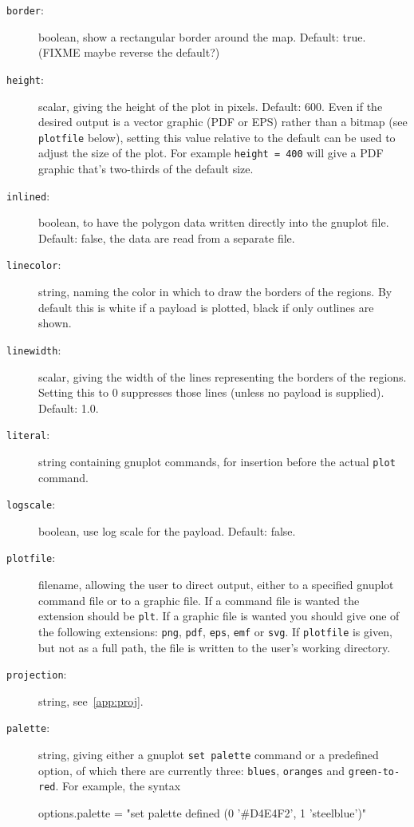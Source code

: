 \documentclass{article}
\begin{document}
\begin{description}
\item[\texttt{border}:] boolean, show a rectangular border around the
  map. Default: true. (FIXME maybe reverse the default?)
\item[\texttt{height}:] scalar, giving the height of the plot in
  pixels. Default: 600. Even if the desired output is a vector graphic
  (PDF or EPS) rather than a bitmap (see \texttt{plotfile} below),
  setting this value relative to the default can be used to adjust the
  size of the plot. For example \texttt{height = 400} will give a PDF
  graphic that's two-thirds of the default size.
\item[\texttt{inlined}:] boolean, to have the polygon data written
  directly into the \textsf{gnuplot} file. Default: false, the data
  are read from a separate file.
\item[\texttt{linecolor}:] string, naming the color in which to draw
  the borders of the regions. By default this is white if a payload is
  plotted, black if only outlines are shown.
\item[\texttt{linewidth}:] scalar, giving the width of the lines
  representing the borders of the regions. Setting this to 0
  suppresses those lines (unless no payload is supplied). Default:
  1.0.
\item[\texttt{literal}:] string containing \textsf{gnuplot} commands,
  for insertion before the actual \texttt{plot} command.
\item[\texttt{logscale}:] boolean, use log scale for the
  payload. Default: false.
\item[\texttt{plotfile}:] filename, allowing the user to direct
  output, either to a specified \textsf{gnuplot} command file or to a
  graphic file. If a command file is wanted the extension should be
  \texttt{plt}. If a graphic file is wanted you should give one of the
  following extensions: \texttt{png}, \texttt{pdf}, \texttt{eps},
  \texttt{emf} or \texttt{svg}.  If \texttt{plotfile} is given, but
  not as a full path, the file is written to the user's working
  directory.
\item[\texttt{projection}:] string, see~\ref{app:proj}.
\item[\texttt{palette}:] string, giving either a \textsf{gnuplot}
  \texttt{set palette} command or a predefined option, of which there
  are currently three: \texttt{blues}, \texttt{oranges} and
  \texttt{green-to-red}. For example, the syntax
  \begin{code}
    options.palette = "set palette defined (0 '#D4E4F2', 1 'steelblue')"

\end{code}
\end{description}
\end{document}
